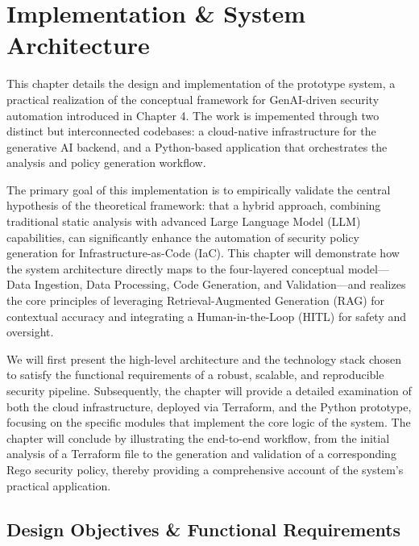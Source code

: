 \chapter{Implementation & System Architecture}


This chapter details the design and implementation of the prototype system, a practical realization of the conceptual framework for GenAI-driven security automation introduced in Chapter 4. The work is impemented through two distinct but interconnected codebases: a cloud-native infrastructure for the generative AI backend, and a Python-based application that orchestrates the analysis and policy generation workflow.

The primary goal of this implementation is to empirically validate the central hypothesis of the theoretical framework: that a hybrid approach, combining traditional static analysis with advanced Large Language Model (LLM) capabilities, can significantly enhance the automation of security policy generation for Infrastructure-as-Code (IaC). This chapter will demonstrate how the system architecture directly maps to the four-layered conceptual model—Data Ingestion, Data Processing, Code Generation, and Validation—and realizes the core principles of leveraging Retrieval-Augmented Generation (RAG) for contextual accuracy and integrating a Human-in-the-Loop (HITL) for safety and oversight.

We will first present the high-level architecture and the technology stack chosen to satisfy the functional requirements of a robust, scalable, and reproducible security pipeline. Subsequently, the chapter will provide a detailed examination of both the cloud infrastructure, deployed via Terraform, and the Python prototype, focusing on the specific modules that implement the core logic of the system. The chapter will conclude by illustrating the end-to-end workflow, from the initial analysis of a Terraform file to the generation and validation of a corresponding Rego security policy, thereby providing a comprehensive account of the system's practical application.

\section{Design Objectives & Functional Requirements}



